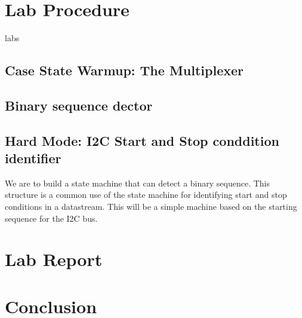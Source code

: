       \clearpage
      
\section{ Lab Procedure}
 labs 
  \subsection{Case State Warmup: The Multiplexer}

  \subsection{Binary sequence dector}

  \subsection{Hard Mode: I2C Start and Stop conddition identifier}
  We are to build a state machine that can detect a binary sequence. This structure is a common use of the state machine for identifying start and stop conditions in a datastream. This will be a simple machine based on the starting sequence for the I2C bus.
\section{ Lab Report}
  

\section{ Conclusion}
 

